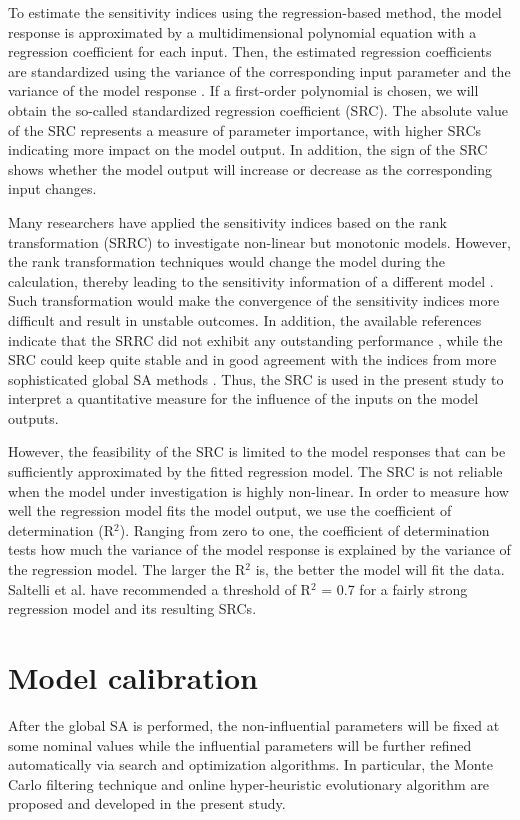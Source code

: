 To estimate the sensitivity indices using the regression-based method, the model response is approximated by a multidimensional polynomial equation with a regression coefficient for each input. Then, the estimated regression coefficients are standardized using the variance of the corresponding input parameter and the variance of the model response \cite{saltelli2004sensitivity}. If a first-order polynomial is chosen, we will obtain the so-called standardized regression coefficient (SRC). The absolute value of the SRC represents a measure of parameter importance, with higher SRCs indicating more impact on the model output. In addition, the sign of the SRC shows whether the model output will increase or decrease as the corresponding input changes.

Many researchers \cite{tian2013review} have applied the sensitivity indices based on the rank transformation (SRRC) to investigate non-linear but monotonic models. However, the rank transformation techniques would change the model during the calculation, thereby leading to the sensitivity information of a different model \cite{saltelli2004sensitivity}. Such transformation would make the convergence of the sensitivity indices more difficult \cite{nguyen2015performance} and result in unstable outcomes. In addition, the available references indicate that the SRRC did not exhibit any outstanding performance \cite{de2009identification,nguyen2015performance}, while the SRC could keep quite stable and in good agreement with the indices from more sophisticated global SA methods \cite{menberg2016sensitivity}. Thus, the SRC is used in the present study to interpret a quantitative measure for the influence of the inputs on the model outputs.

However, the feasibility of the SRC is limited to the model responses that can be sufficiently approximated by the fitted regression model. The SRC is not reliable when the model under investigation is highly non-linear. In order to measure how well the regression model fits the model output, we use the coefficient of determination (R$^2$). Ranging from zero to one, the coefficient of determination tests how much the variance of the model response is explained by the variance of the regression model. The larger the R$^2$ is, the better the model will fit the data. Saltelli et al. \cite{saltelli2004sensitivity} have recommended a threshold of R$^2$ = 0.7 for a fairly strong regression model and its resulting SRCs.

\section{Model calibration}
 After the global SA is performed, the non-influential parameters will be fixed at some nominal values while the influential parameters will be further refined automatically via search and optimization algorithms. In particular, the Monte Carlo filtering technique and online hyper-heuristic evolutionary algorithm are proposed and developed in the present study. 

